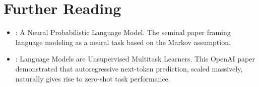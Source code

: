 \section{Further Reading}
\label{ch:06:sec:further}

\begin{itemize}
  \item \textcite{bengio2003}: A Neural Probabilistic Language Model. The seminal paper framing language modeling as a neural task based on the Markov assumption.
  \item \textcite{gpt2}: Language Models are Unsupervised Multitask Learners. This OpenAI paper demonstrated that autoregressive next-token prediction, scaled massively, naturally gives rise to zero-shot task performance.
\end{itemize}
